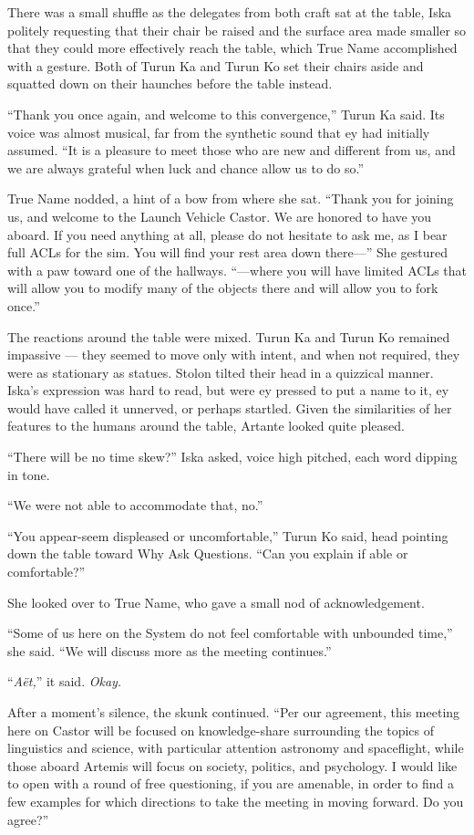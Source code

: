 There was a small shuffle as the delegates from both craft sat at the table, Iska politely requesting that their chair be raised and the surface area made smaller so that they could more effectively reach the table, which True Name accomplished with a gesture. Both of Turun Ka and Turun Ko set their chairs aside and squatted down on their haunches before the table instead.

``Thank you once again, and welcome to this convergence,'' Turun Ka said. Its voice was almost musical, far from the synthetic sound that ey had initially assumed. ``It is a pleasure to meet those who are new and different from us, and we are always grateful when luck and chance allow us to do so.''

True Name nodded, a hint of a bow from where she sat. ``Thank you for joining us, and welcome to the Launch Vehicle Castor. We are honored to have you aboard. If you need anything at all, please do not hesitate to ask me, as I bear full ACLs for the sim. You will find your rest area down there—'' She gestured with a paw toward one of the hallways. ``—where you will have limited ACLs that will allow you to modify many of the objects there and will allow you to fork once.''

The reactions around the table were mixed. Turun Ka and Turun Ko remained impassive — they seemed to move only with intent, and when not required, they were as stationary as statues. Stolon tilted their head in a quizzical manner. Iska's expression was hard to read, but were ey pressed to put a name to it, ey would have called it unnerved, or perhaps startled. Given the similarities of her features to the humans around the table, Artante looked quite pleased.

``There will be no time skew?'' Iska asked, voice high pitched, each word dipping in tone.

``We were not able to accommodate that, no.''

``You appear-seem displeased or uncomfortable,'' Turun Ko said, head pointing down the table toward Why Ask Questions. ``Can you explain if able or comfortable?''

She looked over to True Name, who gave a small nod of acknowledgement.

``Some of us here on the System do not feel comfortable with unbounded time,'' she said. ``We will discuss more as the meeting continues.''

``\emph{Aët,}'' it said. \emph{Okay.}

After a moment's silence, the skunk continued. ``Per our agreement, this meeting here on Castor will be focused on knowledge-share surrounding the topics of linguistics and science, with particular attention astronomy and spaceflight, while those aboard Artemis will focus on society, politics, and psychology. I would like to open with a round of free questioning, if you are amenable, in order to find a few examples for which directions to take the meeting in moving forward. Do you agree?''

